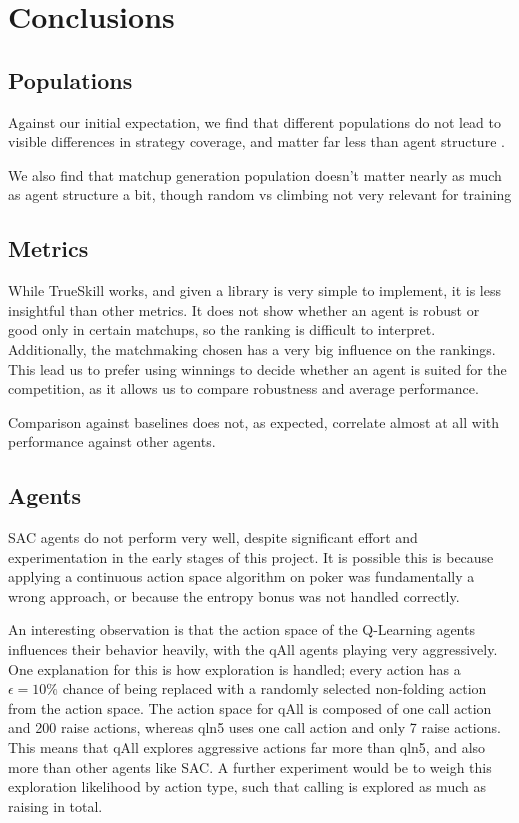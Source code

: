 \chapter{Conclusions}

\section{Populations}
Against our initial expectation, we find that different populations do not lead to visible differences in strategy coverage, and matter far less than agent structure .

We also find that matchup generation
    population doesn't matter nearly as much as agent structure
      a bit, though
    random vs climbing not very relevant for training

\section{Metrics}
While TrueSkill works, and given a library is very simple to implement, it is less insightful than other metrics. It does not show whether an agent is robust or good only in certain matchups, so the ranking is difficult to interpret. Additionally, the matchmaking chosen has a very big influence on the rankings. This lead us to prefer using winnings to decide whether an agent is suited for the competition, as it allows us to compare robustness and average performance.

Comparison against baselines does not, as expected, correlate almost at all with performance against other agents.

\section{Agents}
SAC agents do not perform very well, despite significant effort and experimentation in the early stages of this project. It is possible this is because applying a continuous action space algorithm on poker was fundamentally a wrong approach, or because the entropy bonus was not handled correctly.

An interesting observation is that the action space of the Q-Learning agents influences their behavior heavily, with the qAll agents playing very aggressively. One explanation for this is how exploration is handled; every action has a $\epsilon = 10\%$ chance of being replaced with a randomly selected non-folding action from the action space. The action space for qAll is composed of one call action and 200 raise actions, whereas qln5 uses one call action and only 7 raise actions. This means that qAll explores aggressive actions far more than qln5, and also more than other agents like SAC. A further experiment would be to weigh this exploration likelihood by action type, such that calling is explored as much as raising in total.